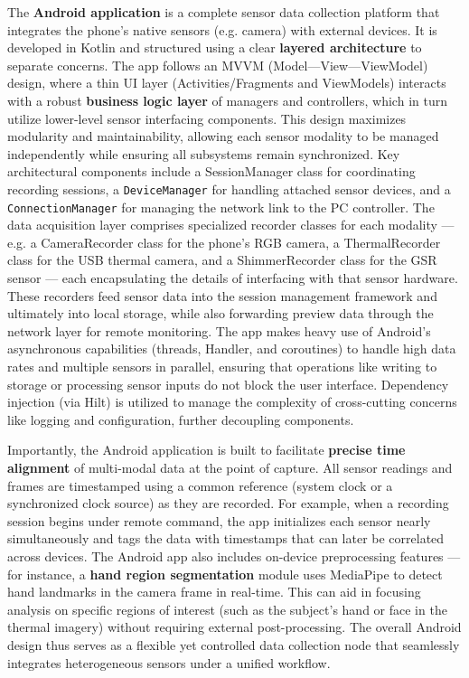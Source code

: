 \documentclass[11pt,a4paper]{report}
\begin{document}
The \textbf{Android application} is a complete sensor data collection
platform that integrates the phone's native sensors (e.g. camera) with
external devices. It is developed in Kotlin and structured using a clear
\textbf{layered architecture} to separate concerns. The app follows an MVVM
(Model---View---ViewModel) design, where a thin UI layer
(Activities/Fragments and ViewModels) interacts with a robust \textbf{business
logic layer} of managers and controllers, which in turn utilize
lower-level sensor interfacing components. This design maximizes
modularity and maintainability, allowing each sensor modality to be
managed independently while ensuring all subsystems remain synchronized.
Key architectural components include a SessionManager class for coordinating
recording sessions, a \texttt{DeviceManager} for handling attached sensor
devices, and a \texttt{ConnectionManager} for managing the network link to the
PC
controller\cite{Fowles1981}.
The data acquisition layer comprises specialized recorder classes for
each modality --- e.g. a CameraRecorder class for the phone's RGB camera, a
ThermalRecorder class for the USB thermal camera, and a ShimmerRecorder class
for the GSR sensor --- each encapsulating the details of interfacing with
that sensor
hardware\cite{Healey2005}.
These recorders feed sensor data into the session management framework
and ultimately into local storage, while also forwarding preview data
through the network layer for remote monitoring. The app makes heavy use
of Android's asynchronous capabilities (threads, Handler, and
coroutines) to handle high data rates and multiple sensors in parallel,
ensuring that operations like writing to storage or processing sensor
inputs do not block the user interface. Dependency injection (via Hilt)
is utilized to manage the complexity of cross-cutting concerns like
logging and configuration, further decoupling components.

Importantly, the Android application is built to facilitate \textbf{precise
time alignment} of multi-modal data at the point of capture. All sensor
readings and frames are timestamped using a common reference (system
clock or a synchronized clock source) as they are recorded. For example,
when a recording session begins under remote command, the app
initializes each sensor nearly simultaneously and tags the data with
timestamps that can later be correlated across devices. The Android app
also includes on-device preprocessing features --- for instance, a \textbf{hand
region segmentation} module uses MediaPipe to detect hand landmarks in
the camera frame in
real-time\cite{Picard2001}.
This can aid in focusing analysis on specific regions of interest (such
as the subject's hand or face in the thermal imagery) without requiring
external post-processing. The overall Android design thus serves as a
flexible yet controlled data collection node that seamlessly integrates
heterogeneous sensors under a unified workflow.
\end{document}
